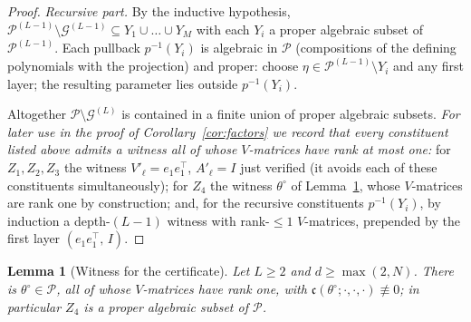 \documentclass[11pt]{article}
\newtheorem{lemma}[theorem]{Lemma}
\theoremstyle{definition}
\theoremstyle{remark}
\theoremstyle{plain}
\newcommand{\cP}{\mathcal{P}}
\newcommand{\cG}{\mathcal{G}}
\begin{document}
\begin{proof}
\emph{Recursive part.}  By the inductive hypothesis,
$\cP^{(L-1)}\setminus\cG^{(L-1)}\subseteq Y_1\cup\dots\cup Y_M$ with each $Y_i$ a
proper algebraic subset of $\cP^{(L-1)}$.  Each pullback $p^{-1}(Y_i)$ is algebraic in
$\cP$ (compositions of the defining polynomials with the projection) and proper:
choose $\eta\in\cP^{(L-1)}\setminus Y_i$ and any first layer; the resulting parameter
lies outside $p^{-1}(Y_i)$.

Altogether $\cP\setminus\cG^{(L)}$ is contained in a finite union of proper algebraic
subsets.  \emph{For later use in the proof of Corollary~\ref{cor:factors} we record
that every constituent listed above admits a witness all of whose $V$-matrices have
rank at most one:} for $Z_1,Z_2,Z_3$ the witness $V'_\ell=e_1e_1^\top$,
$A'_\ell=I$ just verified (it avoids each of these constituents simultaneously); for
$Z_4$ the witness $\theta^\circ$ of Lemma~\ref{lem:witness}, whose $V$-matrices are
rank one by construction; and, for the recursive constituents $p^{-1}(Y_i)$, by
induction a depth-$(L-1)$ witness with rank-$\le1$ $V$-matrices, prepended by the
first layer $(e_1e_1^\top,\,I)$.
\end{proof}

\begin{lemma}[Witness for the certificate]\label{lem:witness}
Let $L\ge2$ and $d\ge\max(2,N)$.  There is $\theta^\circ\in\cP$, all of whose
$V$-matrices have rank one, with
$\mathfrak c(\theta^\circ;\cdot,\cdot,\cdot)\not\equiv0$; in particular $Z_4$ is a
proper algebraic subset of $\cP$.
\end{lemma}
\end{document}
